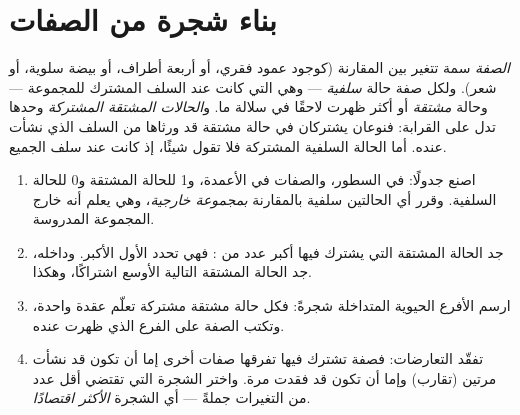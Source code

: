 \section{بناء شجرة من الصفات}

\begin{definition}\label{def:g12:phylogenetic-trees:states}
\emph{الصفة} سمة تتغير بين  المقارنة (كوجود عمود فقري، أو أربعة
أطراف، أو بيضة سلوية، أو شعر). ولكل صفة حالة \emph{سلفية} --- وهي التي
كانت عند السلف المشترك للمجموعة --- وحالة \emph{مشتقة} أو أكثر ظهرت
لاحقًا في سلالة ما. و\emph{الحالات المشتقة المشتركة} وحدها تدل على
القرابة: فنوعان يشتركان في حالة مشتقة قد ورثاها من السلف الذي نشأت
عنده. أما الحالة السلفية المشتركة فلا تقول شيئًا، إذ كانت عند سلف
الجميع.
\end{definition}

\begin{method}\label{met:g12:phylogenetic-trees:build}
\begin{enumerate}
  \item اصنع جدولًا:  في السطور، والصفات في الأعمدة، و1 للحالة
        المشتقة و0 للحالة السلفية. وقرر أي الحالتين سلفية بالمقارنة
        \emph{بمجموعة خارجية}، وهي  يعلم أنه خارج المجموعة
        المدروسة.
  \item جد الحالة المشتقة التي يشترك فيها أكبر عدد من : فهي
        تحدد  الأول الأكبر. وداخله، جد الحالة المشتقة
        التالية الأوسع اشتراكًا، وهكذا.
  \item ارسم الأفرع الحيوية المتداخلة شجرةً: فكل حالة مشتقة مشتركة تعلّم
        عقدة واحدة، وتكتب الصفة على الفرع الذي ظهرت عنده.
  \item تفقّد التعارضات: فصفة تشترك فيها  تفرقها صفات أخرى إما أن
        تكون قد نشأت مرتين (تقارب) وإما أن تكون قد فقدت مرة. واختر
        الشجرة التي تقتضي أقل عدد من التغيرات جملةً --- أي الشجرة
        \emph{الأكثر اقتصادًا}.
\end{enumerate}
\end{method}

